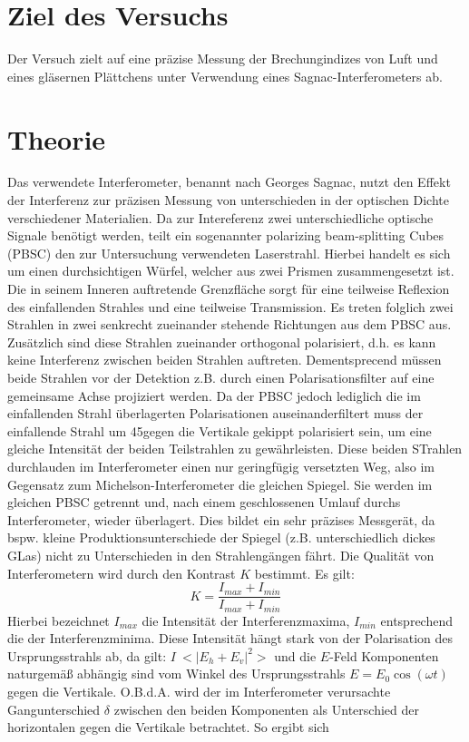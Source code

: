 

  \section{Ziel des Versuchs}
  Der Versuch zielt auf eine präzise Messung der Brechungindizes von Luft und eines gläsernen Plättchens unter Verwendung eines Sagnac-Interferometers ab.

  \section{Theorie}
  Das verwendete Interferometer, benannt nach Georges Sagnac, nutzt den Effekt der Interferenz zur präzisen Messung von unterschieden in der optischen Dichte verschiedener Materialien. Da zur Intereferenz zwei unterschiedliche optische Signale benötigt werden, teilt ein sogenannter polarizing beam-splitting Cubes (PBSC) den zur Untersuchung verwendeten Laserstrahl. Hierbei handelt es sich um einen durchsichtigen Würfel, welcher aus zwei Prismen zusammengesetzt ist. Die in seinem Inneren auftretende Grenzfläche sorgt für eine teilweise Reflexion des einfallenden Strahles und eine teilweise Transmission. Es treten folglich zwei Strahlen in zwei senkrecht zueinander stehende Richtungen aus dem PBSC aus. Zusätzlich sind diese Strahlen zueinander orthogonal polarisiert, d.h. es kann keine Interferenz zwischen beiden Strahlen auftreten. Dementsprecend müssen beide Strahlen vor der Detektion z.B. durch einen Polarisationsfilter auf eine gemeinsame Achse projiziert werden. Da der PBSC jedoch lediglich die im einfallenden Strahl überlagerten Polarisationen auseinanderfiltert muss der einfallende Strahl um 45\circ gegen die Vertikale gekippt polarisiert sein, um eine gleiche Intensität der beiden Teilstrahlen zu gewährleisten. Diese beiden STrahlen durchlauden im Interferometer einen nur geringfügig versetzten Weg, also im Gegensatz zum Michelson-Interferometer die gleichen Spiegel. Sie werden im gleichen PBSC getrennt und, nach einem geschlossenen Umlauf durchs Interferometer, wieder überlagert. Dies bildet ein sehr präzises Messgerät, da bspw. kleine Produktionsunterschiede der Spiegel (z.B. unterschiedlich dickes GLas) nicht zu Unterschieden in den Strahlengängen fährt. Die Qualität von Interferometern wird durch den Kontrast $K$ bestimmt. Es gilt:
  \begin{equation}
  	\label{eq:kontrast}
	K = \frac{I_{max}+I_{min}}{I_{max}+I_{min}}
  \end{equation}
Hierbei bezeichnet $I_{max}$ die Intensität der Interferenzmaxima, $I_{min}$ entsprechend die der Interferenzminima. Diese Intensität hängt stark von der Polarisation des Ursprungsstrahls ab, da gilt: $I~<|E_h+E_v|^2>$ und die $E$-Feld Komponenten naturgemäß abhängig sind vom Winkel des Ursprungsstrahls $E = E_0 \cos (\omega t)$ gegen die Vertikale. O.B.d.A. wird der im Interferometer verursachte Gangunterschied $\delta$ zwischen den beiden Komponenten als Unterschied der horizontalen gegen die Vertikale betrachtet. So ergibt sich
